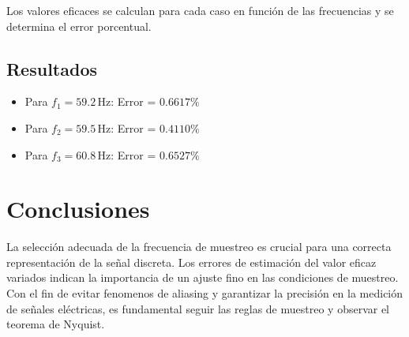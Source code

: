 \documentclass[conference]{IEEEtran}
\theoremstyle{mytheoremstyle}
\theoremstyle{mytheoremstyle}
\theoremstyle{myproblemstyle}
\begin{document}
Los valores eficaces se calculan para cada caso en función de las frecuencias y se determina el error porcentual.

\subsection{Resultados}
\begin{itemize}
    \item Para \( f_1 = 59.2 \, \text{Hz} \): Error = \( 0.6617 \% \)
    \item Para \( f_2 = 59.5 \, \text{Hz} \): Error = \( 0.4110 \% \)
    \item Para \( f_3 = 60.8 \, \text{Hz} \): Error = \( 0.6527 \% \)
\end{itemize}

\section{Conclusiones}
La selección adecuada de la frecuencia de muestreo es crucial para una correcta representación de la señal discreta. Los errores de estimación del valor eficaz variados indican la importancia de un ajuste fino en las condiciones de muestreo. Con el fin de evitar fenomenos de aliasing y garantizar la precisión en la medición de señales eléctricas, es fundamental seguir las reglas de muestreo y observar el teorema de Nyquist.




        
\end{document}
